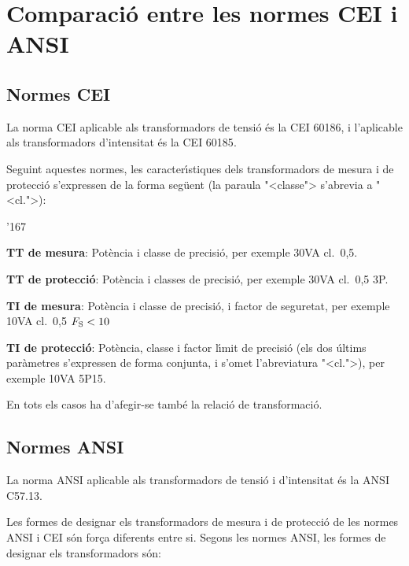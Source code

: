 \section{Comparaci\'{o} entre les normes CEI i
ANSI}\label{sec:comp_tt_ti_cei_ansi}

\subsection{Normes CEI}

La norma \textsf{CEI} aplicable als transformadors de tensi\'{o} \'{e}s la
\textsf{CEI 60186}, i l'aplicable als transformadors
d'intensitat \'{e}s la \textsf{CEI 60185}.

Seguint aquestes normes, les caracter\'{\i}stiques dels transformadors de
mesura i de protecci\'{o} s'expressen de la forma seg\"{u}ent (la paraula
{"<}classe{">} s'abrevia a {"<}cl.{">}):
\begin{dinglist}{'167}
   \item \textbf{TT de mesura}: Pot\`{e}ncia i classe de precisi\'{o}, per
   exemple 30\unit{VA} cl.~0,5.
   \item \textbf{TT de protecci\'{o}}: Pot\`{e}ncia i classes de precisi\'{o}, per
   exemple 30\unit{VA} cl.~0,5 3P.
   \item \textbf{TI de mesura}: Pot\`{e}ncia i classe de precisi\'{o}, i factor de seguretat, per
   exemple 10\unit{VA} cl.~0,5 $F_\mathrm{S}<10$
   \item \textbf{TI de protecci\'{o}}: Pot\`{e}ncia, classe i factor l\'{\i}mit de precisi\'{o}
    (els dos \'{u}ltims par\`{a}metres s'expressen de forma conjunta, i s'omet l'abreviatura {"<}cl.{">}),
     per exemple 10\unit{VA} 5P15.
\end{dinglist}

En tots els casos ha d'afegir-se tamb\'{e} la relaci\'{o} de transformaci\'{o}.

\subsection{Normes ANSI}

La norma \textsf{ANSI} aplicable als transformadors de tensi\'{o} i
d'intensitat \'{e}s la \textsf{ANSI C57.13}.

Les formes de designar els transformadors  de mesura i de protecci\'{o}
de les normes \textsf{ANSI} i \textsf{CEI} s\'{o}n for\c{c}a diferents
entre si. Segons les normes \textsf{ANSI},  les formes de designar
els transformadors s\'{o}n:


